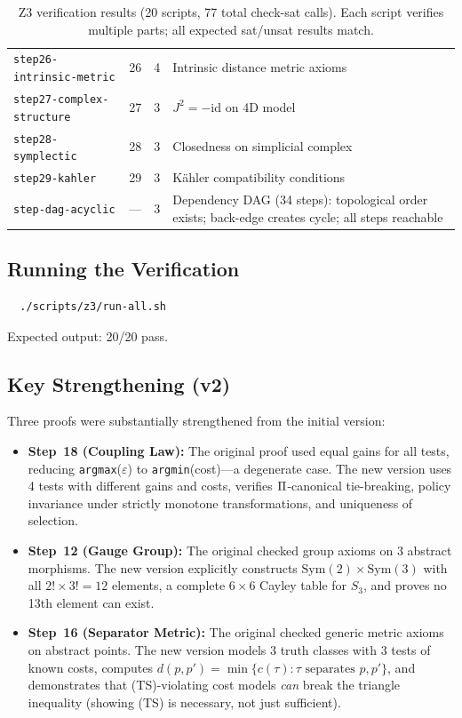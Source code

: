 \begin{table}[h!]
\begin{tabular}{@{}lclp{5.5cm}@{}}
\texttt{step26-intrinsic-metric} & 26 & 4 & Intrinsic distance metric axioms \\
\texttt{step27-complex-structure} & 27 & 3 & $J^2 = -\mathrm{id}$ on 4D model \\
\texttt{step28-symplectic} & 28 & 3 & Closedness on simplicial complex \\
\texttt{step29-kahler} & 29 & 3 & K\"ahler compatibility conditions \\
\texttt{step-dag-acyclic} & --- & 3 & Dependency DAG (34 steps): topological order exists; back-edge creates cycle; all steps reachable \\
\bottomrule
\end{tabular}
\caption{Z3 verification results (20 scripts, 77 total check-sat calls).  Each script verifies multiple parts; all expected sat/unsat results match.}
\label{tab:z3-results}
\end{table}

\subsection{Running the Verification}

\begin{verbatim}
  ./scripts/z3/run-all.sh
\end{verbatim}
Expected output: 20/20 pass.

\subsection{Key Strengthening (v2)}

Three proofs were substantially strengthened from the initial version:

\begin{itemize}
  \item \textbf{Step~18 (Coupling Law):} The original proof used equal gains
    for all tests, reducing \texttt{argmax}($\varepsilon$) to
    \texttt{argmin}(cost)---a degenerate case.  The new version uses 4 tests
    with different gains and costs, verifies $\Pi$-canonical tie-breaking,
    policy invariance under strictly monotone transformations, and uniqueness
    of selection.

  \item \textbf{Step~12 (Gauge Group):} The original checked group axioms on
    3 abstract morphisms.  The new version explicitly constructs
    $\mathrm{Sym}(2) \times \mathrm{Sym}(3)$ with all $2! \times 3! = 12$
    elements, a complete $6 \times 6$ Cayley table for $S_3$, and proves no
    13th element can exist.

  \item \textbf{Step~16 (Separator Metric):} The original checked generic
    metric axioms on abstract points.  The new version models 3 truth classes
    with 3 tests of known costs, computes $d(p,p') = \min\{c(\tau) : \tau
    \text{ separates } p, p'\}$, and demonstrates that (TS)-violating cost
    models \emph{can} break the triangle inequality (showing (TS) is
    necessary, not just sufficient).
\end{itemize}

